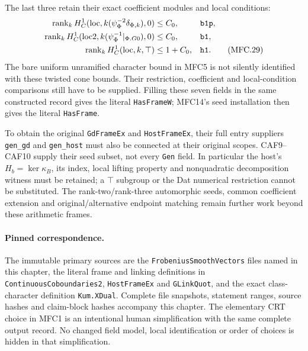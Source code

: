 The last three retain their exact coefficient modules and local
conditions:
\begin{align}
 \operatorname{rank}_k H^1_C(\operatorname{loc},
       k(\psi_\Phi^{-2}\delta_{\Phi,k}),0)&\le C_0,
          &&\texttt{b1p},\notag\\
 \operatorname{rank}_k H^1_C(\operatorname{loc2},
       k(\psi_\Phi^{-1}|_{\Phi.G0}),0)&\le C_0,
          &&\texttt{b1},\notag\\
 \operatorname{rank}_k H^1_C(\operatorname{loc},k,\top)
                                                &\le1+C_0,
          &&\texttt{h1}.                                  \tag{MFC.29}
\end{align}
The bare uniform unramified character bound in MFC5 is not
silently identified with these twisted cone bounds.  Their
restriction, coefficient and local-condition comparisons still
have to be supplied.  Filling these seven fields in the same
constructed record gives the literal \texttt{HasFrameW};
MFC14's seed installation then gives the literal
\texttt{HasFrame}.

To obtain the original \texttt{GdFrameEx} and
\texttt{HostFrameEx}, their full entry suppliers
\texttt{gen\_gd} and \texttt{gen\_host} must also be connected
at their original scopes.  CAF9--CAF10 supply their seed subset,
not every \texttt{Gen} field.  In particular the host's
\(H_b=\ker\kappa_B\), its index, local lifting property
and nonquadratic decomposition witness must be retained; a
\(\top\) subgroup or the Dat numerical restriction cannot
be substituted.  The rank-two/rank-three automorphic seeds,
common coefficient extension and original/alternative endpoint
matching remain further work beyond these arithmetic frames.

\paragraph{Pinned correspondence.}
The immutable primary sources are the \texttt{FrobeniusSmoothVectors}
files named in this chapter, the literal frame and linking definitions
in \texttt{Continuous\allowbreak Coboundaries2}, \texttt{HostFrameEx} and
\texttt{GLinkQuot}, and the exact class-character definition
\texttt{Kum.XDual}.  Complete file snapshots, statement ranges,
source hashes and claim-block hashes accompany this chapter.
The elementary CRT choice in MFC1 is an intentional human
simplification with the same complete output record.  No changed
field model, local identification or order of choices is hidden
in that simplification.
